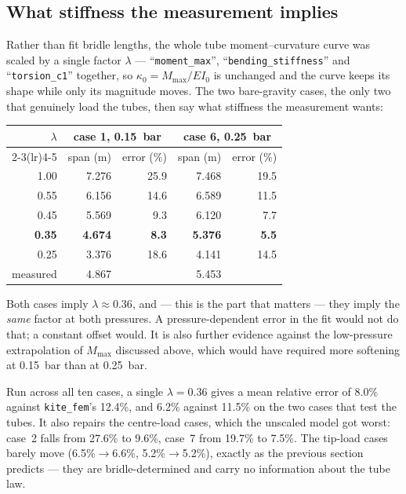 \documentclass[11pt,a4paper]{article}
\begin{document}
\subsection{What stiffness the measurement implies}
\label{sec:hang-lambda}

Rather than fit bridle lengths, the whole tube moment--curvature curve was
scaled by a single factor $\lambda$ --- ``\texttt{moment\_max}'',
``\texttt{bending\_stiffness}'' and ``\texttt{torsion\_c1}'' together, so
$\kappa_0 = M_\text{max}/EI_0$ is unchanged and the curve keeps its shape while
only its magnitude moves. The two bare-gravity cases, the only two that
genuinely load the tubes, then say what stiffness the measurement wants:

\begin{center}
\begin{tabular}{rrrrr}
\toprule
$\lambda$ & \multicolumn{2}{c}{case 1, \SI{0.15}{bar}} & \multicolumn{2}{c}{case 6, \SI{0.25}{bar}} \\
\cmidrule(lr){2-3}\cmidrule(lr){4-5}
 & span (m) & error (\%) & span (m) & error (\%) \\
\midrule
1.00 & 7.276 & 25.9 & 7.468 & 19.5 \\
0.55 & 6.156 & 14.6 & 6.589 & 11.5 \\
0.45 & 5.569 &  9.3 & 6.120 &  7.7 \\
\textbf{0.35} & \textbf{4.674} & \textbf{8.3} & \textbf{5.376} & \textbf{5.5} \\
0.25 & 3.376 & 18.6 & 4.141 & 14.5 \\
\midrule
\multicolumn{1}{r}{measured} & 4.867 & & 5.453 & \\
\bottomrule
\end{tabular}
\end{center}

\noindent
Both cases imply $\lambda \approx 0.36$, and --- this is the part that matters
--- they imply the \emph{same} factor at both pressures. A pressure-dependent
error in the fit would not do that; a constant offset would. It is also further
evidence against the low-pressure extrapolation of $M_\text{max}$ discussed
above, which would have required more softening at \SI{0.15}{bar} than at
\SI{0.25}{bar}.

Run across all ten cases, a single $\lambda = 0.36$ gives a mean relative error
of 8.0\% against \texttt{kite\_fem}'s 12.4\%, and 6.2\% against 11.5\% on the two
cases that test the tubes. It also repairs the centre-load cases, which the
unscaled model got worst: case~2 falls from 27.6\% to 9.6\%, case~7 from 19.7\%
to 7.5\%. The tip-load cases barely move (6.5\%$\to$6.6\%, 5.2\%$\to$5.2\%),
exactly as the previous section predicts --- they are bridle-determined and
carry no information about the tube law.
\end{document}
